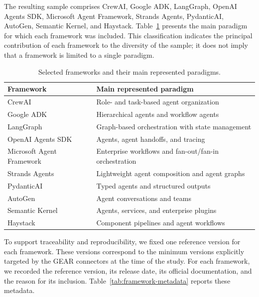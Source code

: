 The resulting sample comprises CrewAI, Google ADK, LangGraph, OpenAI Agents
SDK, Microsoft Agent Framework, Strands Agents, PydanticAI, AutoGen, Semantic
Kernel, and Haystack. Table~\ref{tab:selected-frameworks} presents the main
paradigm for which each framework was included. This classification indicates
the principal contribution of each framework to the diversity of the sample;
it does not imply that a framework is limited to a single paradigm.

\begin{table}[t]
    \centering
    \caption{Selected frameworks and their main represented paradigms.}
    \label{tab:selected-frameworks}
    \small
    \begin{tabularx}{\columnwidth}{
        @{}
        p{}
        >{\raggedright\arraybackslash}X
        @{}
    }
        \toprule
        \textbf{Framework} & \textbf{Main represented paradigm} \\
        \midrule
        CrewAI
            & Role- and task-based agent organization \\
        Google ADK
            & Hierarchical agents and workflow agents \\
        LangGraph
            & Graph-based orchestration with state management \\
        OpenAI Agents SDK
            & Agents, agent handoffs, and tracing \\
        Microsoft Agent Framework
            & Enterprise workflows and fan-out/fan-in orchestration \\
        Strands Agents
            & Lightweight agent composition and agent graphs \\
        PydanticAI
            & Typed agents and structured outputs \\
        AutoGen
            & Agent conversations and teams \\
        Semantic Kernel
            & Agents, services, and enterprise plugins \\
        Haystack
            & Component pipelines and agent workflows \\
        \bottomrule
    \end{tabularx}
\end{table}

To support traceability and reproducibility, we fixed one reference version
for each framework. These versions correspond to the minimum versions
explicitly targeted by the GEAR connectors at the time of the study. For each
framework, we recorded the reference version, its release date, its official
documentation, and the reason for its inclusion.
Table~\ref{tab:framework-metadata} reports these metadata.

